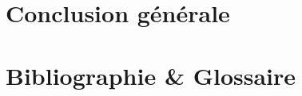 \documentclass[a4paper, 11pt, french]{report}
\begin{document}
                                                                                                                                                                                                                                                                            \chapter{Conclusion
                                                                                                                                                                                                                                                                            générale}
                                                                                                                                                                                                                                                                              
                                                                                                                                                                                                                                                                                \chapter{Bibliographie
                                                                                                                                                                                                                                                                                \&
                                                                                                                                                                                                                                                                                Glossaire}
                                                                                                                                                                                                                                                                                  
                                                                                                                                                                                                                                                                                   
                                                                                                                                                                                                                                                                                     \appendix
                                                                                                                                                                                                                                                                                       
\end{document}
